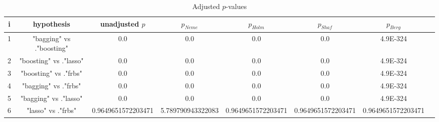 \documentclass[a4paper,10pt]{article}
\begin{document}
\begin{landscape}
\begin{table}[!htp]
\centering\tiny
\caption{Adjusted $p$-values}
\begin{tabular}{cccccccc}
i&hypothesis&unadjusted $p$&$p_{Neme}$&$p_{Holm}$&$p_{Shaf}$&$p_{Berg}$\\
\hline
1&"bagging" vs ."boosting"&0.0&0.0&0.0&0.0&4.9E-324\\
2&"boosting" vs ."lasso"&0.0&0.0&0.0&0.0&4.9E-324\\
3&"boosting" vs ."frbs"&0.0&0.0&0.0&0.0&4.9E-324\\
4&"bagging" vs ."frbs"&0.0&0.0&0.0&0.0&4.9E-324\\
5&"bagging" vs ."lasso"&0.0&0.0&0.0&0.0&4.9E-324\\
6&"lasso" vs ."frbs"&0.9649651572203471&5.789790943322083&0.9649651572203471&0.9649651572203471&0.9649651572203471\\
\hline
\end{tabular}
\end{table}

\end{landscape}
\end{document}
